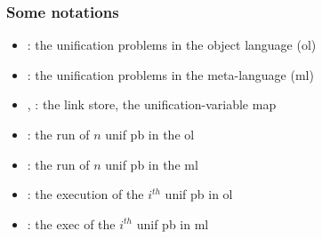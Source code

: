 \documentclass{pres}
\newcommand{\sepFrame}[1]{
  \section{#1}
  \begin{frame}
    \centering
    {\usebeamerfont*{frametitle}\usebeamercolor[fg]{frametitle} #1}
  \end{frame}
}
\begin{document}


\def\llam{\ensuremath{{\mathcal{L}_\lambda}}\xspace}
\begin{frame}
  \frametitle{Some notations}

  \begin{itemize}
    \item \foUnifPb: the unification problems in the object language (ol)
    \item \hoUnifPb: the unification problems in the meta-language (ml)
    \item \linkStore, \mapStore: the link store, the unification-variable map
  \end{itemize}

  \mysep

  \begin{itemize}
    \item {}: the run of $n$ unif pb in the ol
    \item {}: the run of $n$ unif pb in the ml
    \item {}: the execution of the $i^{th}$ unif pb in ol
    \item {}: the exec of the $i^{th}$ unif pb in ml
  \end{itemize}


\end{frame}
\end{document}

